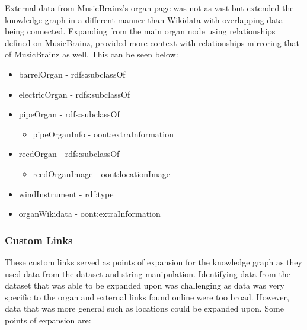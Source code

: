 External data from MusicBrainz's organ page \cite{organmusicbrainz} was not as vast but extended the knowledge graph in a different manner than Wikidata with overlapping data being connected. Expanding from the main organ node using relationships defined on MusicBrainz, provided more context with relationships mirroring that of MusicBrainz as well. This can be seen below:

\vspace{-0.15cm}
\begin{itemize}
    \itemsep0em 
    \item barrelOrgan - rdfs:subclassOf
           \vspace{-0.025cm}
    \item electricOrgan - rdfs:subclassOf
           \vspace{-0.025cm}
    \item pipeOrgan - rdfs:subclassOf
    \begin{itemize}
        \itemsep0em 
        \vspace{-0.2cm}
        \item pipeOrganInfo - oont:extraInformation
        \vspace{-0.2cm}
    \end{itemize}
    \item reedOrgan - rdfs:subclassOf
    \begin{itemize}
        \itemsep0em 
        \vspace{-0.2cm}
        \item reedOrganImage - oont:locationImage
        \vspace{-0.2cm}
    \end{itemize}
    \item windInstrument - rdf:type
           \vspace{-0.025cm}
    \item organWikidata - oont:extraInformation
\end{itemize}

\subsubsection{Custom Links}
\hspace*{0.5cm} These custom links served as points of expansion for the knowledge graph as they used data from the dataset and string manipulation. Identifying data from the dataset that was able to be expanded upon was challenging as data was very specific to the organ and external links found online were too broad. However, data that was more general such as locations could be expanded upon. Some points of expansion are:

